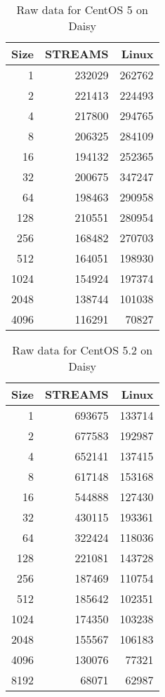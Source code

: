 \documentclass[letterpaper,final,notitlepage,twocolumn,10pt,twoside]{article}
\begin{document}
\begin{appendix}
\begin{table}[hp]
\footnotesize
\setlength{\tabcolsep}{0.3em}
\setlength{\arraycolsep}{0.3em}
\begin{center}
\begin{tabular}{rrr}\\
\hline
Size & STREAMS & Linux\\
\hline
\hline
1 & 232029 & 262762\\
2 & 221413 & 224493\\
4 & 217800 & 294765\\
8 & 206325 & 284109\\
16 & 194132 & 252365\\
32 & 200675 & 347247\\
64 & 198463 & 290958\\
128 & 210551 & 280954\\
256 & 168482 & 270703\\
512 & 164051 & 198930\\
1024 & 154924 & 197374\\
2048 & 138744 & 101038\\
4096 & 116291 & 70827\\
\hline
\end{tabular}
\end{center}
\caption{Raw data for CentOS 5 on Daisy}
\label{table:cos5data}
\normalsize
\end{table}

\begin{table}[hp]
\footnotesize
\setlength{\tabcolsep}{0.3em}
\setlength{\arraycolsep}{0.3em}
\begin{center}
\begin{tabular}{rrr}\\
\hline
Size & STREAMS & Linux\\
\hline
\hline
1 & 693675 & 133714\\
2 & 677583 & 192987\\
4 & 652141 & 137415\\
8 & 617148 & 153168\\
16 & 544888 & 127430\\
32 & 430115 & 193361\\
64 & 322424 & 118036\\
128 & 221081 & 143728\\
256 & 187469 & 110754\\
512 & 185642 & 102351\\
1024 & 174350 & 103238\\
2048 & 155567 & 106183\\
4096 & 130076 & 77321\\
8192 & 68071 & 62987\\
\hline
\end{tabular}
\end{center}
\caption{Raw data for CentOS 5.2 on Daisy}
\label{table:cos52data}
\normalsize
\end{table}


\end{appendix}
\end{document}
